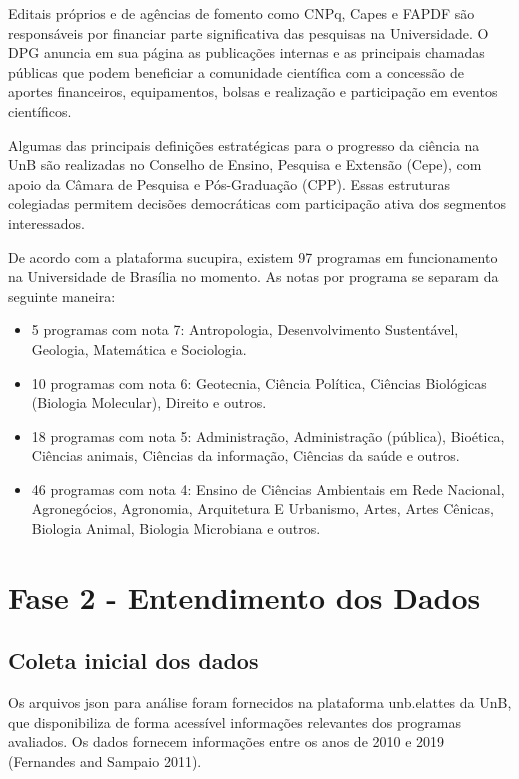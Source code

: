 \documentclass[]{article}
\providecommand{\tightlist}{%
  \setlength{\itemsep}{0pt}\setlength{\parskip}{0pt}}
\begin{document}
Editais próprios e de agências de fomento como CNPq, Capes e FAPDF são
responsáveis por financiar parte significativa das pesquisas na
Universidade. O DPG anuncia em sua página as publicações internas e as
principais chamadas públicas que podem beneficiar a comunidade
científica com a concessão de aportes financeiros, equipamentos, bolsas
e realização e participação em eventos científicos.

Algumas das principais definições estratégicas para o progresso da
ciência na UnB são realizadas no Conselho de Ensino, Pesquisa e Extensão
(Cepe), com apoio da Câmara de Pesquisa e Pós-Graduação (CPP). Essas
estruturas colegiadas permitem decisões democráticas com participação
ativa dos segmentos interessados.

De acordo com a plataforma sucupira, existem 97 programas em
funcionamento na Universidade de Brasília no momento. As notas por
programa se separam da seguinte maneira:

\begin{itemize}
\tightlist
\item
  5 programas com nota 7: Antropologia, Desenvolvimento Sustentável,
  Geologia, Matemática e Sociologia.
\item
  10 programas com nota 6: Geotecnia, Ciência Política, Ciências
  Biológicas (Biologia Molecular), Direito e outros.
\item
  18 programas com nota 5: Administração, Administração (pública),
  Bioética, Ciências animais, Ciências da informação, Ciências da saúde
  e outros.
\item
  46 programas com nota 4: Ensino de Ciências Ambientais em Rede
  Nacional, Agronegócios, Agronomia, Arquitetura E Urbanismo, Artes,
  Artes Cênicas, Biologia Animal, Biologia Microbiana e outros.
\end{itemize}

\hypertarget{fase-2---entendimento-dos-dados}{%
\section{Fase 2 - Entendimento dos
Dados}\label{fase-2---entendimento-dos-dados}}

\hypertarget{coleta-inicial-dos-dados}{%
\subsection{Coleta inicial dos dados}\label{coleta-inicial-dos-dados}}

Os arquivos json para análise foram fornecidos na plataforma unb.elattes
da UnB, que disponibiliza de forma acessível informações relevantes dos
programas avaliados. Os dados fornecem informações entre os anos de 2010
e 2019 (Fernandes and Sampaio 2011).
\end{document}
